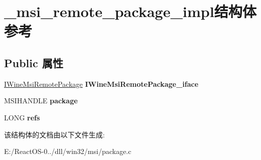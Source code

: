 \hypertarget{struct__msi__remote__package__impl}{}\section{\+\_\+msi\+\_\+remote\+\_\+package\+\_\+impl结构体 参考}
\label{struct__msi__remote__package__impl}
\subsection*{Public 属性}
\begin{DoxyCompactItemize}
\item 
\mbox{\label{struct__msi__remote__package__impl_aa18a01d9b3383cd5e26d7c18d4d08806}} 
\hyperlink{interface_i_wine_msi_remote_package}{I\+Wine\+Msi\+Remote\+Package} {\bfseries I\+Wine\+Msi\+Remote\+Package\+\_\+iface}
\item 
\mbox{\label{struct__msi__remote__package__impl_a9c3ded2fbcf33f0d35bfef72e2be09cd}} 
M\+S\+I\+H\+A\+N\+D\+LE {\bfseries package}
\item 
\mbox{\label{struct__msi__remote__package__impl_abf7d59dda1500418c0531ba827a6e2b6}} 
L\+O\+NG {\bfseries refs}
\end{DoxyCompactItemize}


该结构体的文档由以下文件生成\+:\begin{DoxyCompactItemize}
\item 
E\+:/\+React\+O\+S-\/0../dll/win32/msi/package.\+c\end{DoxyCompactItemize}
